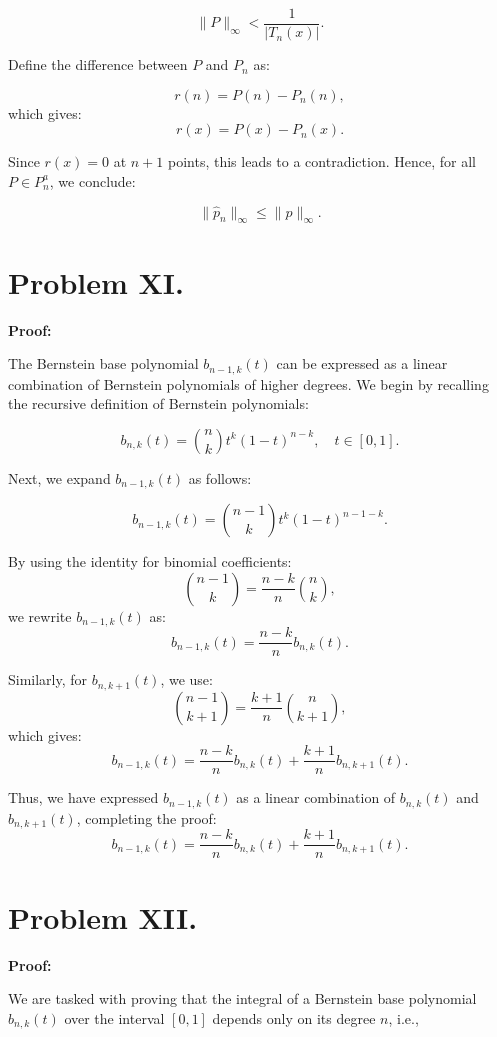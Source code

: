 \documentclass[a4paper, 12pt]{article}
\renewcommand{\qed}{\hfill \boxed{\mathbb{Q.E.D.}}}
\begin{document}
\[
\|P\|_\infty < \frac{1}{|T_n(x)|}.
\]

Define the difference between \( P \) and \( P_n \) as:

\[
r(n) = P(n) - P_n(n),
\]
which gives:
\[
r(x) = P(x) - P_n(x).
\]

Since \( r(x) = 0 \) at \( n+1 \) points, this leads to a contradiction. Hence, for all \( P \in P^a_n \), we conclude:

\[
\|\hat{p}_n\|_\infty \leq \|p\|_\infty.
\]

\qed

\section*{Problem XI.}

\textbf{Proof:}

The Bernstein base polynomial \( b_{n-1,k}(t) \) can be expressed as a linear combination of Bernstein polynomials of higher degrees. We begin by recalling the recursive definition of Bernstein polynomials:

\[
b_{n,k}(t) = \binom{n}{k} t^k (1 - t)^{n-k}, \quad t \in [0,1].
\]

Next, we expand \( b_{n-1,k}(t) \) as follows:

\[
b_{n-1,k}(t) = \binom{n-1}{k} t^k (1 - t)^{n-1-k}.
\]

By using the identity for binomial coefficients:
\[
\binom{n-1}{k} = \frac{n-k}{n} \binom{n}{k},
\]
we rewrite \( b_{n-1,k}(t) \) as:
\[
b_{n-1,k}(t) = \frac{n-k}{n} b_{n,k}(t).
\]

Similarly, for \( b_{n,k+1}(t) \), we use:
\[
\binom{n-1}{k+1} = \frac{k+1}{n} \binom{n}{k+1},
\]
which gives:
\[
b_{n-1,k}(t) = \frac{n-k}{n} b_{n,k}(t) + \frac{k+1}{n} b_{n,k+1}(t).
\]

Thus, we have expressed \( b_{n-1,k}(t) \) as a linear combination of \( b_{n,k}(t) \) and \( b_{n,k+1}(t) \), completing the proof:
\[
b_{n-1,k}(t) = \frac{n-k}{n} b_{n,k}(t) + \frac{k+1}{n} b_{n,k+1}(t).
\]

\qed

\section*{Problem XII.}

\textbf{Proof:}

We are tasked with proving that the integral of a Bernstein base polynomial \( b_{n,k}(t) \) over the interval \([0,1]\) depends only on its degree \( n \), i.e.,
\end{document}
